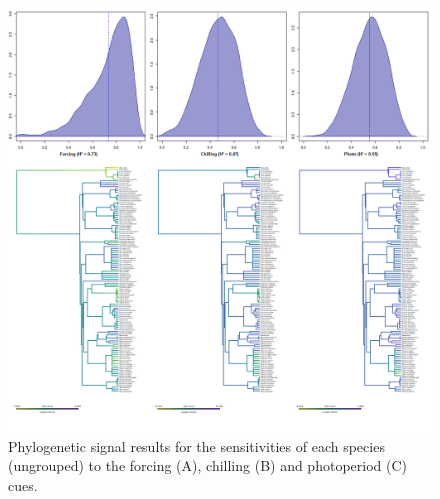\documentclass{article}\usepackage[]{graphicx}\usepackage[]{color}
\begin{document}
\begin{figure} [H]
  \begin{center}
  \includegraphics[width=14cm]{..//..//analyses/phylogeny/figures/Sensitivities_phylosig_spslev.png}
  \caption{Phylogenetic signal results for the sensitivities of each species (ungrouped) to the forcing (A), chilling (B) and photoperiod (C) cues.}
  \label{fig:phylosig_spp}
  \end{center}
  \end{figure}
\end{document}
